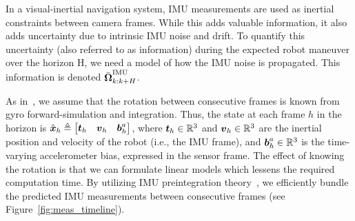In a visual-inertial navigation system, IMU measurements are used as inertial constraints between camera frames.
While this adds valuable information, it also adds uncertainty due to intrinsic IMU noise and drift.
To quantify this uncertainty (also referred to as information) during the expected robot maneuver over the horizon H, we need a model of how the IMU noise is propagated.
This information is denoted $\bar{\boldsymbol \Omega}_{k:k+H}^\text{IMU}$.

As in~\cite{Carlone2017}, we assume that the rotation between consecutive frames is known from gyro forward-simulation and integration.
Thus, the state at each frame $h$ in the horizon is $\hat{\boldsymbol x}_h\triangleq\begin{bmatrix}\boldsymbol t_h&\boldsymbol v_h&\boldsymbol b^a_h\end{bmatrix}$, where $\boldsymbol t_h\in\mathbb{R}^3$ and  $\boldsymbol v_h\in\mathbb{R}^3$ are the inertial position and velocity of the robot (i.e., the IMU frame), and $\boldsymbol b^a_h\in\mathbb{R}^3$ is the time-varying accelerometer bias, expressed in the sensor frame.
The effect of knowing the rotation is that we can formulate linear models which lessens the required computation time.
By utilizing IMU preintegration theory~\cite{Forster2017}, we efficiently bundle the predicted IMU measurements between consecutive frames (see Figure~\ref{fig:meas_timeline}).


